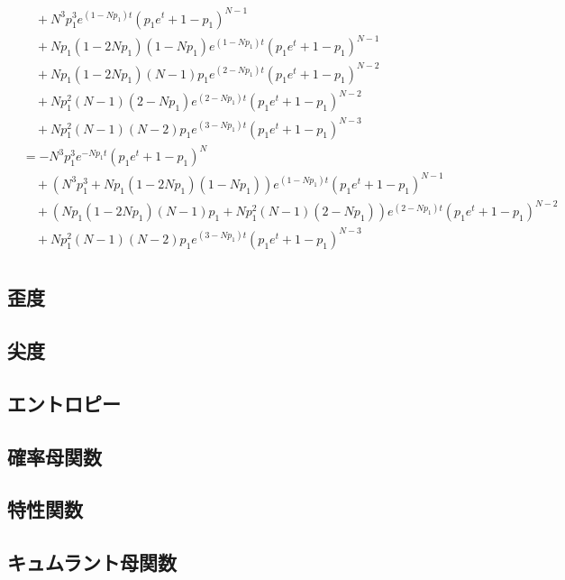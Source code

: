 \documentclass[dvipdfmx]{jsarticle}
\begin{document}
\begin{align}
  &\quad+N^3p_1^3e^{\left(1-Np_1\right)t}\left(p_1e^t+1-p_1\right)^{N-1}\nonumber\\
  &\quad+Np_1\left(1-2Np_1\right)\left(1-Np_1\right)e^{\left(1-Np_1\right)t}\left(p_1e^t+1-p_1\right)^{N-1}\nonumber\\
  &\quad+Np_1\left(1-2Np_1\right)\left(N-1\right)p_1e^{\left(2-Np_1\right)t}\left(p_1e^t+1-p_1\right)^{N-2}\nonumber\\
  &\quad+Np_1^2\left(N-1\right)\left(2-Np_1\right)e^{\left(2-Np_1\right)t}\left(p_1e^t+1-p_1\right)^{N-2}\nonumber\\
  &\quad+Np_1^2\left(N-1\right)\left(N-2\right)p_1e^{\left(3-Np_1\right)t}\left(p_1e^t+1-p_1\right)^{N-3}\nonumber\\
  &=-N^3p_1^3e^{-Np_1t}\left(p_1e^t+1-p_1\right)^N\nonumber\\
  &\quad+\left(N^3p_1^3+Np_1\left(1-2Np_1\right)\left(1-Np_1\right)\right)e^{\left(1-Np_1\right)t}\left(p_1e^t+1-p_1\right)^{N-1}\nonumber\\
  &\quad+\left(Np_1\left(1-2Np_1\right)\left(N-1\right)p_1+Np_1^2\left(N-1\right)\left(2-Np_1\right)\right)e^{\left(2-Np_1\right)t}\left(p_1e^t+1-p_1\right)^{N-2}\nonumber\\
  &\quad+Np_1^2\left(N-1\right)\left(N-2\right)p_1e^{\left(3-Np_1\right)t}\left(p_1e^t+1-p_1\right)^{N-3}\nonumber\\
 \end{align}
 \subsection{歪度}
 \subsection{尖度}
 \subsection{エントロピー}
 \subsection{確率母関数}
 \subsection{特性関数}
 \subsection{キュムラント母関数}
\end{document}

